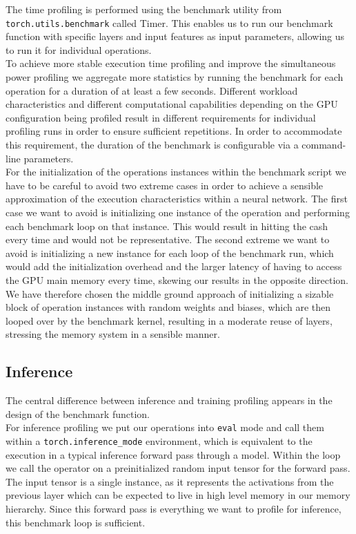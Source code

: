 \vspace{1cm}



The time profiling is performed using the benchmark utility from \texttt{torch.utils.benchmark} called Timer. This enables us to run our benchmark function with specific layers and input features as input parameters, allowing us to run it for individual operations. \\
To achieve more stable execution time profiling and improve the simultaneous power profiling we aggregate more statistics by running the benchmark for each operation for a duration of at least a few seconds. Different workload characteristics and different computational capabilities depending on the GPU configuration being profiled result in different requirements for individual profiling runs in order to ensure sufficient repetitions. In order to accommodate this requirement, the duration of the benchmark is configurable via a command-line parameters. \\
For the initialization of the operations instances within the benchmark script we have to be careful to avoid two extreme cases in order to achieve a sensible approximation of the execution characteristics within a neural network. The first case we want to avoid is initializing one instance of the operation and performing each benchmark loop on that instance. This would result in hitting the cash every time and would not be representative. The second extreme we want to avoid is initializing a new instance for each loop of the benchmark run, which would add the initialization overhead and the larger latency of having to access the GPU main memory every time, skewing our results in the opposite direction. We have therefore chosen the middle ground approach of initializing a sizable block of operation instances with random weights and biases, which are then looped over by the benchmark kernel, resulting in a moderate reuse of layers, stressing the memory system in a sensible manner. \\


\subsection{Inference}
The central difference between inference and training profiling appears in the design of the benchmark function. \\
For inference profiling we put our operations into \texttt{eval} mode and call them within a \texttt{torch.inference\_mode} environment, which is equivalent to the execution in a typical inference forward pass through a model. Within the loop we call the operator on a preinitialized random input tensor for the forward pass. The input tensor is a single instance, as it represents the activations from the previous layer which can be expected to live in high level memory in our memory hierarchy. Since this forward pass is everything we want to profile for inference, this benchmark loop is sufficient.

